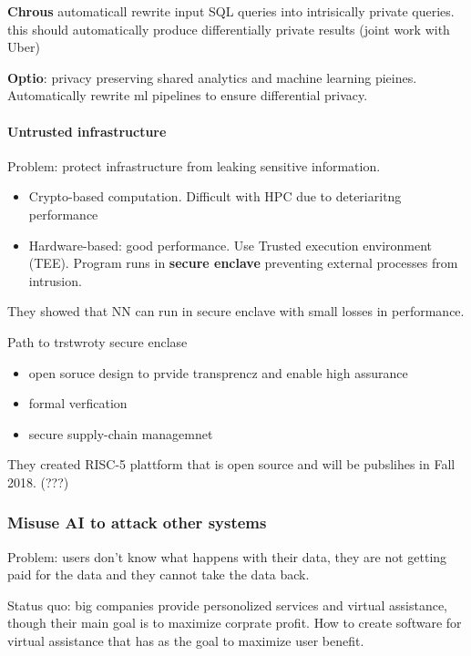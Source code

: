 \documentclass[11pt,oneside,a4paper]{scrartcl}
\begin{document}
\textbf{Chrous} automaticall rewrite input SQL queries into
intrisically private queries. this should automatically produce
differentially private results (joint work with Uber)

\textbf{Optio}: privacy preserving shared analytics and machine learning
pieines. Automatically rewrite ml pipelines to ensure differential
privacy.

\paragraph{Untrusted infrastructure}

Problem: protect infrastructure from leaking sensitive information.

\begin{itemize}
\item Crypto-based computation. Difficult with HPC due to deteriaritng performance
  
\item Hardware-based: good performance. Use Trusted execution
  environment (TEE). Program runs in \textbf{secure enclave} preventing
  external processes from intrusion. 
\end{itemize}

They showed that NN can run in
secure enclave with small losses in performance.

Path to trstwroty secure enclase
\begin{itemize}
\item open soruce design to prvide transprencz and enable high
assurance
\item formal verfication
\item secure supply-chain managemnet
\end{itemize}

They created RISC-5 plattform that is open source and will be
pubslihes in Fall 2018. (???)

\subsubsection{Misuse AI to attack other systems}
\label{sec:misuse-ai-attack}

Problem: users don't know what happens with their data, they are not
getting paid for the data and they cannot take the data back.

Status quo: big companies provide personolized services and virtual
assistance, though their main goal is to maximize corprate profit. How
to create software for virtual assistance that has as the goal to
maximize user benefit.
\end{document}
